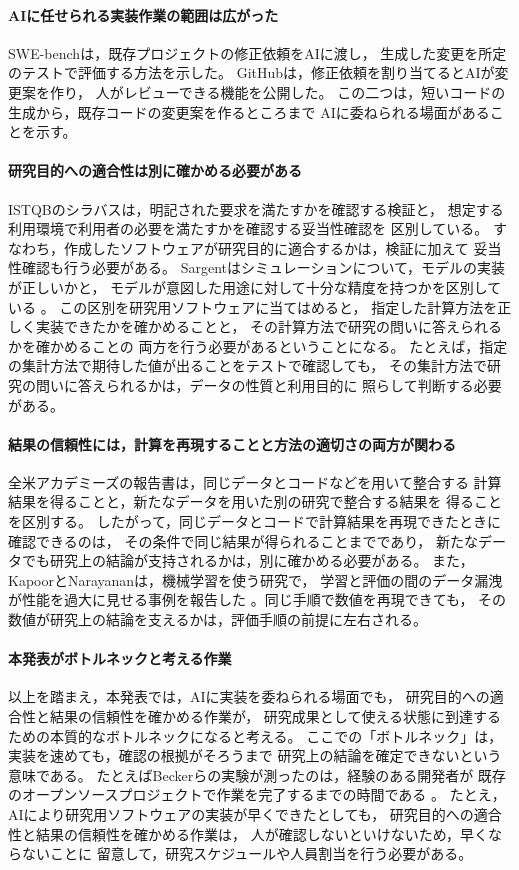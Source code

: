 \documentclass[platex]{jlreq}
\begin{document}
\paragraph{AIに任せられる実装作業の範囲は広がった}
SWE-benchは，既存プロジェクトの修正依頼をAIに渡し，
生成した変更を所定のテストで評価する方法を示した\cite{jimenez2024swebench}。
GitHubは，修正依頼を割り当てるとAIが変更案を作り，
人がレビューできる機能を公開した\cite{github2025codingagent}。
この二つは，短いコードの生成から，既存コードの変更案を作るところまで
AIに委ねられる場面があることを示す。

\paragraph{研究目的への適合性は別に確かめる必要がある}
ISTQBのシラバスは，明記された要求を満たすかを確認する検証と，
想定する利用環境で利用者の必要を満たすかを確認する妥当性確認を
区別している\cite{jstqb2023,istqb2024}。
すなわち，作成したソフトウェアが研究目的に適合するかは，検証に加えて
妥当性確認も行う必要がある。
Sargentはシミュレーションについて，モデルの実装が正しいかと，
モデルが意図した用途に対して十分な精度を持つかを区別している
\cite{sargent2013}。
この区別を研究用ソフトウェアに当てはめると，
指定した計算方法を正しく実装できたかを確かめることと，
その計算方法で研究の問いに答えられるかを確かめることの
両方を行う必要があるということになる。
たとえば，指定の集計方法で期待した値が出ることをテストで確認しても，
その集計方法で研究の問いに答えられるかは，データの性質と利用目的に
照らして判断する必要がある。

\paragraph{結果の信頼性には，計算を再現することと方法の適切さの両方が関わる}
全米アカデミーズの報告書は，同じデータとコードなどを用いて整合する
計算結果を得ることと，新たなデータを用いた別の研究で整合する結果を
得ることを区別する\cite{nasem2019}。
したがって，同じデータとコードで計算結果を再現できたときに確認できるのは，
その条件で同じ結果が得られることまでであり，
新たなデータでも研究上の結論が支持されるかは，別に確かめる必要がある。
また，KapoorとNarayananは，機械学習を使う研究で，
学習と評価の間のデータ漏洩が性能を過大に見せる事例を報告した
\cite{kapoor2023}。同じ手順で数値を再現できても，
その数値が研究上の結論を支えるかは，評価手順の前提に左右される。

\paragraph{本発表がボトルネックと考える作業}
以上を踏まえ，本発表では，AIに実装を委ねられる場面でも，
研究目的への適合性と結果の信頼性を確かめる作業が，
研究成果として使える状態に到達するための本質的なボトルネックになると考える。
ここでの「ボトルネック」は，実装を速めても，確認の根拠がそろうまで
研究上の結論を確定できないという意味である。
たとえばBeckerらの実験が測ったのは，経験のある開発者が
既存のオープンソースプロジェクトで作業を完了するまでの時間である
\cite{becker2025}。
たとえ，AIにより研究用ソフトウェアの実装が早くできたとしても，
研究目的への適合性と結果の信頼性を確かめる作業は，
人が確認しないといけないため，早くならないことに
留意して，研究スケジュールや人員割当を行う必要がある。
\end{document}
